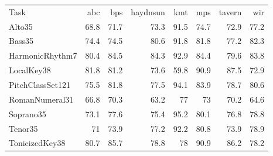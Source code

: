 \begin{tabular}{lrrrrrrr}
Task             & \gls{abc}  & \gls{bps}  & \gls{haydnsun} & \gls{kmt} & \gls{mps}  & \gls{tavern} & \gls{wir}  \\
Alto35           & 68.8 & 71.7 & 73.3     & 91.5    & 74.7 & 72.9   & 77.2 \\
Bass35           & 74.4 & 74.5 & 80.6     & 91.8    & 81.8 & 77.2   & 82.3 \\
HarmonicRhythm7  & 80.4 & 84.5 & 84.3     & 92.9    & 84.4 & 79.6   & 83.8 \\
LocalKey38       & 81.8 & 81.2 & 73.6     & 59.8    & 90.9 & 87.5   & 72.9 \\
PitchClassSet121 & 75.5 & 81.8 & 77.5     & 94.1    & 83.9 & 78.7   & 80.6 \\
RomanNumeral31   & 66.8 & 70.3 & 63.2     & 77      & 73   & 70.2   & 64.6 \\
Soprano35        & 73.1 & 77.6 & 75.4     & 95.2    & 80.1 & 76.8   & 78.8 \\
Tenor35          & 71   & 73.9 & 77.2     & 92.2    & 80.8 & 73.9   & 78.9 \\
TonicizedKey38   & 80.7 & 85.7 & 78.8     & 78      & 90.9 & 86.2   & 78.2
\end{tabular}

